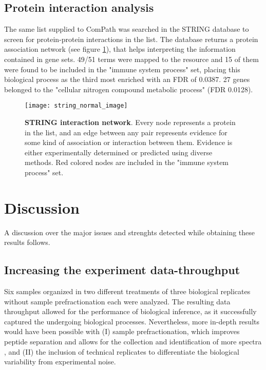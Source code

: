 \subsection{Protein interaction analysis}

The same list supplied to ComPath was searched in the STRING database \cite{Szklarczyk2017} to screen for protein-protein interactions in the list. The database returns a protein association network (see figure \ref{fig:STRING}), that helps interpreting the information contained in gene sets. 49/51 terms were mapped to the resource and 15 of them were found to be included in the "immune system process" set, placing this biological process as the third most enriched with an FDR of 0.0387. 27 genes belonged to the "cellular nitrogen compound metabolic process" (FDR 0.0128).

\begin{figure}[!h]
\centering
\texttt{[image: string\_normal\_image]}
\caption[Protein interaction network]{\textbf{STRING interaction network}. Every node represents a protein in the list, and an edge between any pair represents evidence for some kind of association or interaction between them. Evidence is either experimentally determined or predicted using diverse methods. Red colored nodes are included in the "immune system process" set.}
\label{fig:STRING}
\end{figure}





\section{Discussion}

A discussion over the major issues and strenghts detected while obtaining these results follows.


\subsection{Increasing the experiment data-throughput}

Six samples organized in two different treatments of three biological replicates without sample prefractionation each were analyzed. The resulting data throughput allowed for the performance of biological inference, as it successfully captured the undergoing biological processes. Nevertheless, more in-depth results would have been possible with (I) sample prefractionation, which improves peptide separation and allows for the collection and identification of more spectra \cite{Righetti2005}, and (II) the inclusion of technical replicates to differentiate the biological variability from experimental noise.

